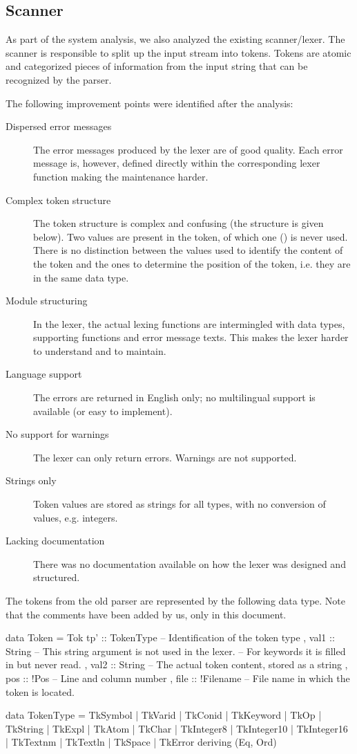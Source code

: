 
\subsection{Scanner}
\label{analysis:lexer}
As part of the system analysis, we also analyzed the existing scanner/lexer.
The scanner is responsible to split up the input stream into tokens.
Tokens are atomic and categorized pieces of information from the input string that can be recognized by the parser.

The following improvement points were identified after the analysis:
\begin{description}
  \item[Dispersed error messages]
    The error messages produced by the lexer are of good quality.
    Each error message is, however, defined directly within the corresponding lexer function making the maintenance harder.
  \item[Complex token structure]
    The token structure is complex and confusing (the structure is given below).
    Two values are present in the token, of which one () is never used.
    There is no distinction between the values used to identify the content of the token and the ones to determine the position of the token, i.e. they are in the same data type.
  \item[Module structuring]
    In the lexer, the actual lexing functions are intermingled with data types, supporting functions and error message texts.
    This makes the lexer harder to understand and to maintain.
  \item[Language support]
    The errors are returned in English only; no multilingual support is available (or easy to implement).
  \item[No support for warnings]
    The lexer can only return errors.
    Warnings are not supported.
  \item[Strings only]
    Token values are stored as strings for all types, with no conversion of values, e.g. integers.
  \item[Lacking documentation]
    There was no documentation available on how the lexer was designed and structured.
\end{description}

The tokens from the old parser are represented by the following data type.
Note that the comments have been added by us, only in this document.

\begin{haskell}
data Token = Tok
 { tp'  :: TokenType -- Identification of the token type
 , val1 :: String    -- This string argument is not used in the lexer.
                     -- For keywords it is filled in but never read.
 , val2 :: String    -- The actual token content, stored as a string
 , pos  :: !Pos      -- Line and column number
 , file :: !Filename -- File name in which the token is located.
 }

data TokenType
  = TkSymbol
  | TkVarid
  | TkConid
  | TkKeyword
  | TkOp
  | TkString
  | TkExpl
  | TkAtom
  | TkChar
  | TkInteger8
  | TkInteger10
  | TkInteger16
  | TkTextnm
  | TkTextln
  | TkSpace
  | TkError
  deriving (Eq, Ord)
\end{haskell}

